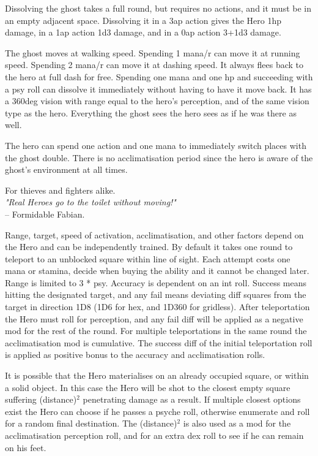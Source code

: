 Dissolving the ghost takes a full round, but requires no actions, and it must be in an empty adjacent space. Dissolving it in a 3ap action gives the Hero 1hp damage, in a 1ap action 1d3 damage, and in a 0ap action 3+1d3 damage.

The ghost moves at walking speed. Spending 1 mana/r can move it at running speed. Spending 2 mana/r can move it at dashing speed. It always flees back to the hero at full dash for free. Spending one mana and one hp and succeeding with a psy roll can dissolve it immediately without having to have it move back.
It has a 360deg vision with range equal to the hero's perception, and of the same vision type as the hero. Everything the ghost sees the hero sees as if he was there as well.

The hero can spend one action and one mana to immediately switch places with the ghost double. There is no acclimatisation period since the hero is aware of the ghost's environment at all times.


 For thieves and fighters alike.\\
\emph{"Real Heroes go to the toilet without moving!"}\\
-- Formidable Fabian.

Range, target, speed of activation, acclimatisation, and other factors depend on the Hero and can be independently trained. By default it takes one round to teleport to an unblocked square within line of sight. Each attempt costs one mana or stamina, decide when buying the ability and it cannot be changed later. Range is limited to 3 * psy. Accuracy is dependent on an int roll. Success means hitting the designated target, and any fail means deviating diff squares from the target in direction 1D8 (1D6 for hex, and 1D360 for gridless). After teleportation the Hero must roll for perception, and any fail diff will be applied as a negative mod for the rest of the round. For multiple teleportations in the same round the acclimatisation mod is cumulative. The success diff of the initial teleportation roll is applied as positive bonus to the accuracy and acclimatisation rolls.

It is possible that the Hero materialises on an already occupied square, or within a solid object. In this case the Hero will be shot to the closest empty square suffering (distance)$^2$ penetrating damage as a result. If multiple closest options exist the Hero can choose if he passes a psyche roll, otherwise enumerate and roll for a random final destination. The (distance)$^2$ is also used as a mod for the acclimatisation perception roll, and for an extra dex roll to see if he can remain on his feet.

